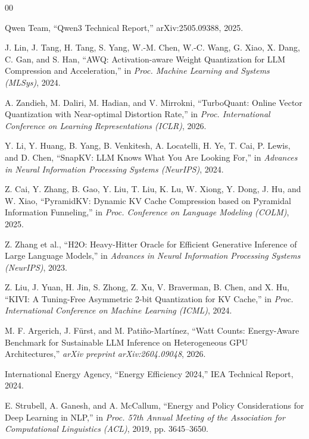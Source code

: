 \documentclass[conference]{IEEEtran}
\begin{document}
\begin{thebibliography}{00}

Qwen Team, ``Qwen3 Technical Report,'' arXiv:2505.09388, 2025.

J. Lin, J. Tang, H. Tang, S. Yang, W.-M. Chen, W.-C. Wang, G. Xiao, X. Dang, C. Gan, and S. Han, ``AWQ: Activation-aware Weight Quantization for LLM Compression and Acceleration,'' in \textit{Proc. Machine Learning and Systems (MLSys)}, 2024.

A. Zandieh, M. Daliri, M. Hadian, and V. Mirrokni, ``TurboQuant: Online Vector Quantization with Near-optimal Distortion Rate,'' in \textit{Proc. International Conference on Learning Representations (ICLR)}, 2026.

Y. Li, Y. Huang, B. Yang, B. Venkitesh, A. Locatelli, H. Ye, T. Cai, P. Lewis, and D. Chen, ``SnapKV: LLM Knows What You Are Looking For,'' in \textit{Advances in Neural Information Processing Systems (NeurIPS)}, 2024.

Z. Cai, Y. Zhang, B. Gao, Y. Liu, T. Liu, K. Lu, W. Xiong, Y. Dong, J. Hu, and W. Xiao, ``PyramidKV: Dynamic KV Cache Compression based on Pyramidal Information Funneling,'' in \textit{Proc. Conference on Language Modeling (COLM)}, 2025.

Z. Zhang et al., ``H2O: Heavy-Hitter Oracle for Efficient Generative Inference of Large Language Models,'' in \textit{Advances in Neural Information Processing Systems (NeurIPS)}, 2023.

Z. Liu, J. Yuan, H. Jin, S. Zhong, Z. Xu, V. Braverman, B. Chen, and X. Hu, ``KIVI: A Tuning-Free Asymmetric 2-bit Quantization for KV Cache,'' in \textit{Proc. International Conference on Machine Learning (ICML)}, 2024.

M. F. Argerich, J. F\"{u}rst, and M. Pati\~{n}o-Mart\'{i}nez, ``Watt Counts: Energy-Aware Benchmark for Sustainable LLM Inference on Heterogeneous GPU Architectures,'' \textit{arXiv preprint arXiv:2604.09048}, 2026.

International Energy Agency, ``Energy Efficiency 2024,'' IEA Technical Report, 2024.

E. Strubell, A. Ganesh, and A. McCallum, ``Energy and Policy Considerations for Deep Learning in NLP,'' in \textit{Proc. 57th Annual Meeting of the Association for Computational Linguistics (ACL)}, 2019, pp. 3645--3650.


\end{thebibliography}
\end{document}

